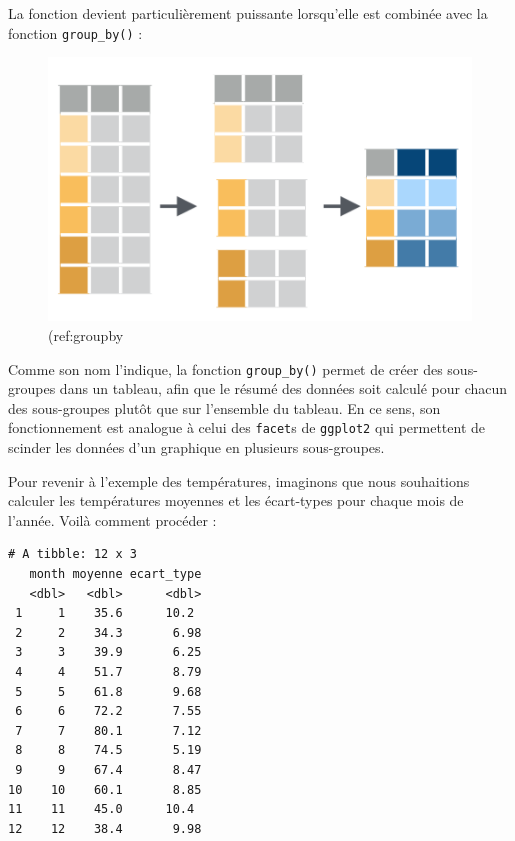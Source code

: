 \documentclass[a4paperpaper,]{article}
\newenvironment{Shaded}{\begin{snugshade}}{\end{snugshade}}
\newcommand{\KeywordTok}[1]{\textcolor[rgb]{0.13,0.29,0.53}{\textbf{#1}}}
\newcommand{\DataTypeTok}[1]{\textcolor[rgb]{0.13,0.29,0.53}{#1}}
\newcommand{\StringTok}[1]{\textcolor[rgb]{0.31,0.60,0.02}{#1}}
\newcommand{\OtherTok}[1]{\textcolor[rgb]{0.56,0.35,0.01}{#1}}
\newcommand{\OperatorTok}[1]{\textcolor[rgb]{0.81,0.36,0.00}{\textbf{#1}}}
\newcommand{\NormalTok}[1]{#1}
\theoremstyle{definition}
\theoremstyle{definition}
\theoremstyle{definition}
\theoremstyle{remark}
\begin{document}
La fonction devient particulièrement puissante lorsqu'elle est combinée
avec la fonction \texttt{group\_by()} :

\begin{figure}[htpb]

{\centering \includegraphics[width=0.65\linewidth]{images/groupby} 

}

\caption{(ref:groupby}\label{fig:groupby}
\end{figure}





Comme son nom l'indique, la fonction \texttt{group\_by()} permet de
créer des sous-groupes dans un tableau, afin que le résumé des données
soit calculé pour chacun des sous-groupes plutôt que sur l'ensemble du
tableau. En ce sens, son fonctionnement est analogue à celui des
\texttt{facet}s de \texttt{ggplot2} qui permettent de scinder les
données d'un graphique en plusieurs sous-groupes.

Pour revenir à l'exemple des températures, imaginons que nous
souhaitions calculer les températures moyennes et les écart-types pour
chaque mois de l'année. Voilà comment procéder :

\begin{Shaded}
\end{Shaded}

\begin{verbatim}
# A tibble: 12 x 3
   month moyenne ecart_type
   <dbl>   <dbl>      <dbl>
 1     1    35.6      10.2 
 2     2    34.3       6.98
 3     3    39.9       6.25
 4     4    51.7       8.79
 5     5    61.8       9.68
 6     6    72.2       7.55
 7     7    80.1       7.12
 8     8    74.5       5.19
 9     9    67.4       8.47
10    10    60.1       8.85
11    11    45.0      10.4 
12    12    38.4       9.98
\end{verbatim}
\end{document}

